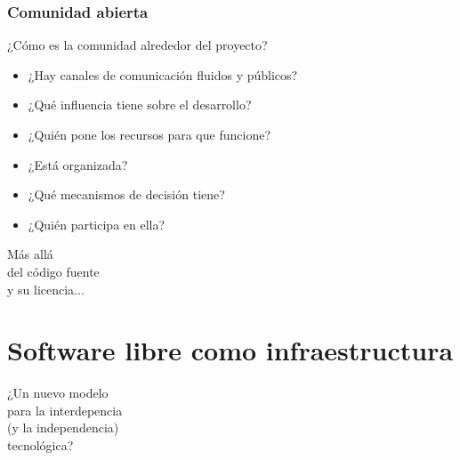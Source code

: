 \documentclass[17pt,aspectratio=169]{beamer}
\begin{document}

\begin{frame}
\frametitle{Comunidad abierta}

¿Cómo es la comunidad alrededor del proyecto?

\begin{itemize}
\item ¿Hay canales de comunicación fluidos y públicos?
\item ¿Qué influencia tiene sobre el desarrollo?
\item ¿Quién pone los recursos para que funcione?
\item ¿Está organizada?
\item ¿Qué mecanismos de decisión tiene?
\item ¿Quién participa en ella?
\end{itemize}

\end{frame}

\begin{frame}

  \begin{center}
    {\Huge Más allá\\ del código fuente\\ y su licencia...\\}
  \end{center}

\end{frame}

\section{Software libre como infraestructura}


\begin{frame}

  \begin{center}
    {\Large ¿Un nuevo modelo\\
      para la interdepencia\\
      (y la independencia)\\
      tecnológica?\\}
  \end{center}

\end{frame}
\end{document}
